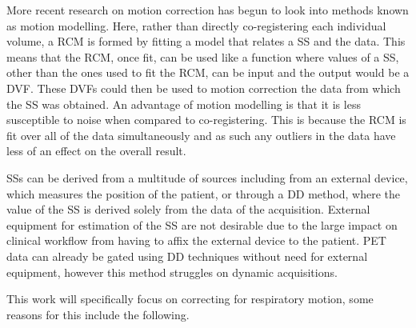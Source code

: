         More recent research on motion correction has begun to look into methods known as motion modelling. Here, rather than directly co-registering each individual volume, a \gls{RCM} is formed by fitting a model that relates a \gls{SS} and the data. This means that the \gls{RCM}, once fit, can be used like a function where values of a \gls{SS}, other than the ones used to fit the \gls{RCM}, can be input and the output would be a \gls{DVF}. These \glspl{DVF} could then be used to motion correction the data from which the \gls{SS} was obtained. An advantage of motion modelling is that it is less susceptible to noise when compared to co-registering. This is because the \gls{RCM} is fit over all of the data simultaneously and as such any outliers in the data have less of an effect on the overall result.
    
        \glspl{SS} can be derived from a multitude of sources including from an external device, which measures the position of the patient, or through a \gls{DD} method, where the value of the \gls{SS} is derived solely from the data of the acquisition. External equipment for estimation of the \gls{SS} are not desirable due to the large impact on clinical workflow from having to affix the external device to the patient. \gls{PET} data can already be gated using \gls{DD} techniques without need for external equipment, however this method struggles on dynamic acquisitions.%
            
        This work will specifically focus on correcting for respiratory motion, some reasons for this include the following.
            
